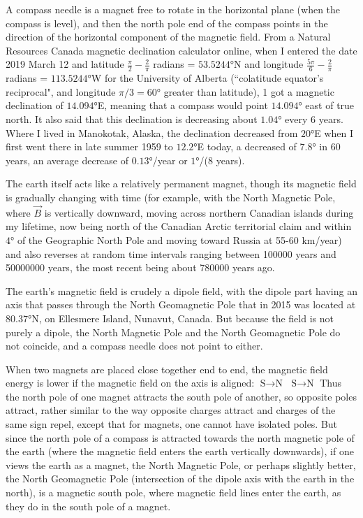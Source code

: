 A compass needle is a magnet free to rotate in the horizontal plane (when the compass is level), and then the north pole end of the compass points in the direction of the horizontal component of the magnetic field. From a Natural Resources Canada magnetic declination calculator online, when I entered the date 2019 March 12 and latitude $\frac{\pi}{2} - \frac{2}{\pi}$ radians = $\ang{53.5244}$N and longitude $\frac{5\pi}{6} - \frac{2}{\pi}$ radians = $\ang{113.5244}$W for the University of Alberta (``colatitude equator's reciprocal", and longitude $\pi/3 = \ang{60}$ greater than latitude), 1 got a magnetic declination of $\ang{14.094}$E, meaning that a compass would point $\ang{14.094}$ east of true north. It also said that this declination is decreasing about $\ang{1.04}$ every 6 years. Where I lived in Manokotak, Alaska, the declination decreased from $\ang{20}$E when I first went there in late summer 1959 to $\ang{12.2}$E today, a decreased of $\ang{7.8}$ in 60 years, an average decrease of $\ang{0.13}$/year or $\ang{1}$/(8 years).

The earth itself acts like a relatively permanent magnet, though its magnetic field is gradually changing with time (for example, with the North Magnetic Pole, where $\vec{B}$ is vertically downward, moving across northern Canadian islands during my lifetime, now being north of the Canadian Arctic territorial claim and within $\ang{4}$ of the Geographic North Pole and moving toward Russia at 55-60 km/year) and also reverses at random time intervals ranging between 100000 years and 50000000 years, the most recent being about 780000 years ago.

The earth's magnetic field is crudely a dipole field, with the dipole part having an axis that passes through the North Geomagnetic Pole that in 2015 was located at $\ang{80.37}$N, on Ellesmere Island, Nunavut, Canada. But because the field is not purely a dipole, the North Magnetic Pole and the North Geomagnetic Pole do not coincide, and a compass needle does not point to either.

When two magnets are placed close together end to end, the magnetic field energy is lower if the magnetic field on the axis is aligned: $\boxed{\text{S} \rightarrow \text{N}}$  $\boxed{\text{S} \rightarrow \text{N}}$ Thus the north pole of one magnet attracts the south pole of another, so opposite poles attract, rather similar to the way opposite charges attract and charges of the same sign repel, except that for magnets, one cannot have isolated poles. But since the north pole of a compass is attracted towards the north magnetic pole of the earth (where the magnetic field enters the earth vertically downwards), if one views the earth as a magnet, the North Magnetic Pole, or perhaps slightly better, the North Geomagnetic Pole (intersection of the dipole axis with the earth in the north), is a magnetic south pole, where magnetic field lines enter the earth, as they do in the south pole of a magnet.

